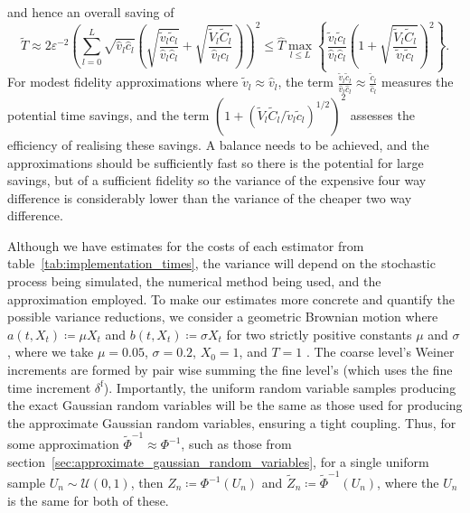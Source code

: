 \documentclass[manuscript,review]{acmart}
\begin{document}
and hence an overall saving of
\begin{equation*}
\tilde{T} 
\approx 2\varepsilon^{-2} \left(\sum_{l=0}^L \sqrt{\hat{v}_l \hat{c}_l} \left( \sqrt{\dfrac{\tilde{v}_l\tilde{c}_l}{\hat{v}_l\hat{c}_l}} + \sqrt{\dfrac{\tilde{V}_l \tilde{C}_l}{\hat{v}_l \hat{c}_l}}\right)\right)^2 
\leq \hat{T} \max_{l \leq L} \left\{ \dfrac{\tilde{v}_l\tilde{c}_l}{\hat{v}_l\hat{c}_l} \left(1 + \sqrt{\dfrac{\tilde{V}_l \tilde{C}_l}{\tilde{v}_l \tilde{c}_l}}\right)^2\right\}.
\end{equation*}
For modest fidelity approximations where $ \tilde{v}_l \approx \hat{v}_l $, the term $ \tfrac{\tilde{v}_l\tilde{c}_l}{\hat{v}_l\hat{c}_l} \approx \tfrac{\tilde{c}_l}{\hat{c}_l}$ measures the potential time savings, and the term $ (1 + (\tilde{V}_l \tilde{C}_l / \tilde{v}_l \tilde{c}_l)^{1/2})^2 $ assesses the efficiency of realising these savings. A balance needs to be achieved, and the approximations should be sufficiently fast so there is the potential for large savings, but of a sufficient fidelity so the variance of the expensive four way difference is considerably lower than the variance of the cheaper two way difference.

Although we have estimates for the costs of each estimator from table~\ref{tab:implementation_times}, the variance will depend on the stochastic process being simulated, the numerical method being used, and the approximation employed. To make our estimates more concrete and quantify the possible variance reductions, we consider a geometric Brownian motion where $ a(t, X_t) \coloneqq \mu X_t $ and $ b(t, X_t) \coloneqq \sigma X_t $ for two strictly positive constants $ \mu $ and $ \sigma $, where we take $ \mu = 0.05 $, $ \sigma = 0.2 $, $ X_0 = 1 $, and $ T = 1 $ \citep[6.1]{giles2008multilevel}. The coarse level's Weiner increments are formed by pair wise summing the fine level's (which uses the fine time increment $ \delta^{\mathrm{f}} $). Importantly, the uniform random variable samples producing the exact Gaussian random variables will be the same as those used for producing the approximate Gaussian random variables, ensuring a tight coupling. Thus, for some approximation $ \tilde{\Phi}^{-1} \approx \Phi^{-1} $, such as those from section~\ref{sec:approximate_gaussian_random_variables}, for a single uniform sample $ U_n \sim \mathcal{U}(0, 1) $, then $ Z_n \coloneqq \Phi^{-1}(U_n) $ and $ \tilde{Z}_n \coloneqq \tilde{\Phi}^{-1}(U_n) $, where the $ U_n $ is the same for both of these.
\end{document}
